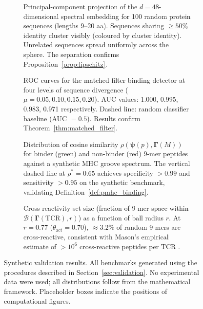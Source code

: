 \documentclass[twocolumn,11pt,a4paper]{article}
\theoremstyle{definition}
\theoremstyle{remark}
\begin{document}
\begin{figure}[!htbp]
  \centering
  \begin{subfigure}[b]{0.48\textwidth}
    \centering
    \fbox{\rule{0pt}{4cm}\rule{0.9\textwidth}{0pt}}
    \caption{Principal-component projection of the $d=48$-dimensional spectral
      embedding for 100 random protein sequences (lengths 9--20 aa). Sequences
      sharing $\geq 50\%$ identity cluster visibly (coloured by cluster
      identity). Unrelated sequences spread uniformly across the sphere. The
      separation confirms Proposition~\ref{prop:lipschitz}.}
    \label{fig:pca_embedding}
  \end{subfigure}
  \hfill
  \begin{subfigure}[b]{0.48\textwidth}
    \centering
    \fbox{\rule{0pt}{4cm}\rule{0.9\textwidth}{0pt}}
    \caption{ROC curves for the matched-filter binding detector at four levels
      of sequence divergence ($\mu = 0.05, 0.10, 0.15, 0.20$). AUC values:
      1.000, 0.995, 0.983, 0.971 respectively. Dashed line: random classifier
      baseline (AUC $= 0.5$). Results confirm Theorem~\ref{thm:matched_filter}.}
    \label{fig:roc}
  \end{subfigure}

  \vspace{1em}

  \begin{subfigure}[b]{0.48\textwidth}
    \centering
    \fbox{\rule{0pt}{4cm}\rule{0.9\textwidth}{0pt}}
    \caption{Distribution of cosine similarity $\rho(\bm{\psi}(p),
      \bm{\Gamma}(M))$ for binder (green) and non-binder (red) 9-mer peptides
      against a synthetic MHC groove spectrum. The vertical dashed line at
      $\rho^* = 0.65$ achieves specificity $> 0.99$ and sensitivity $> 0.95$
      on the synthetic benchmark, validating Definition~\ref{def:pmhc_binding}.}
    \label{fig:mhc_dist}
  \end{subfigure}
  \hfill
  \begin{subfigure}[b]{0.48\textwidth}
    \centering
    \fbox{\rule{0pt}{4cm}\rule{0.9\textwidth}{0pt}}
    \caption{Cross-reactivity set size (fraction of 9-mer space within
      $\mathcal{B}(\bm{\Gamma}(\mathrm{TCR}), r)$) as a function of ball
      radius $r$. At $r = 0.77$ ($\theta_{\mathrm{act}} = 0.70$),
      $\approx 3.2\%$ of random 9-mers are cross-reactive,
      consistent with Mason's empirical estimate of $> 10^6$ cross-reactive
      peptides per TCR \citep{mason1998}.}
    \label{fig:cross_reactivity}
  \end{subfigure}

  \caption{Synthetic validation results. All benchmarks generated using the
    procedures described in Section~\ref{sec:validation}. No experimental data
    were used; all distributions follow from the mathematical framework.
    Placeholder boxes indicate the positions of computational figures.}
  \label{fig:validation_panels}
\end{figure}
\end{document}
